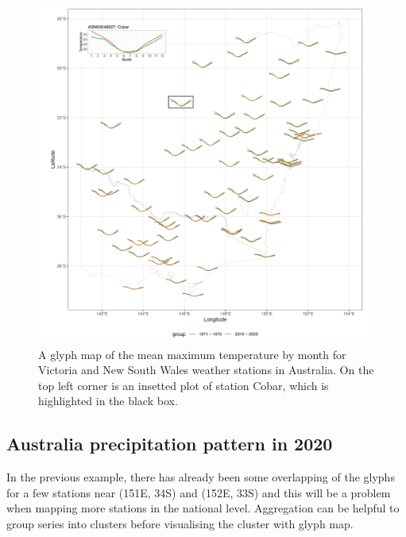 \documentclass[
]{jss}
\begin{document}
\begin{CodeChunk}
\begin{figure}

{\centering \includegraphics[width=1\linewidth,height=0.7\textheight]{figures/basic-manip} 

}

\caption[A glyph map of the mean maximum temperature by month for Victoria and New South Wales weather stations in Australia]{A glyph map of the mean maximum temperature by month for Victoria and New South Wales weather stations in Australia. On the top left corner is an insetted plot of station Cobar, which is highlighted in the black box.}\label{fig:basic-manip}
\end{figure}
\end{CodeChunk}

\hypertarget{australia-precipitation-pattern-in-2020}{%
\subsection{Australia precipitation pattern in
2020}\label{australia-precipitation-pattern-in-2020}}

In the previous example, there has already been some overlapping of the
glyphs for a few stations near (151E, 34S) and (152E, 33S) and this will
be a problem when mapping more stations in the national level.
Aggregation can be helpful to group series into clusters before
visualising the cluster with glyph map.
\end{document}
